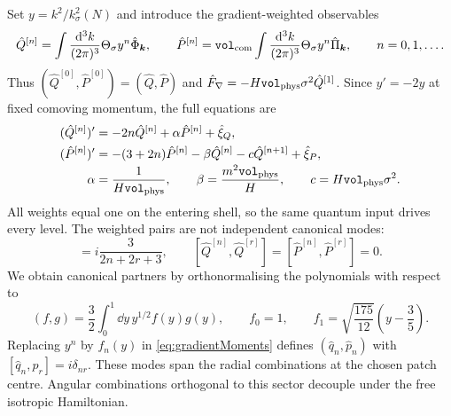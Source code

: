 \documentclass{article}
\newcommand{\VF}{\mathtt{vol}_{\rm com}}
\newcommand{\Vphys}{\mathtt{vol}_{\rm phys}}
\numberwithin{equation}{section}
\begin{document}
Set $y=k^2/k_\sigma^2(N)$ and introduce the gradient-weighted observables
\begin{equation}
 \hat Q^{[n]}=\int\frac{\dd^3k}{(2\pi)^3}\Theta_\sigma y^n\hat\Phi_{\bm k},
 \qquad
 \hat P^{[n]}=\VF\int\frac{\dd^3k}{(2\pi)^3}\Theta_\sigma y^n\hat\Pi_{\bm k},
 \qquad n=0,1,\ldots .
 \label{eq:gradientMoments}
\end{equation}
Thus $(\hat Q^{[0]},\hat P^{[0]})=(\hat Q,\hat P)$ and $\hat F_\nabla=-H\Vphys\sigma^2\hat Q^{[1]}$. Since $y'=-2y$ at fixed comoving momentum, the full equations are
\begin{subequations}\label{eq:gradientHierarchy}
\begin{align}
 (\hat Q^{[n]})'&=-2n\hat Q^{[n]}+\alpha\hat P^{[n]}+\hat\xi_Q,\\
 (\hat P^{[n]})'&=-(3+2n)\hat P^{[n]}-\beta\hat Q^{[n]}-c\hat Q^{[n+1]}+\hat\xi_P,\\[-2pt]
 \alpha&=\frac{1}{H\Vphys},\qquad \beta=\frac{m^2\Vphys}{H},\qquad c=H\Vphys\sigma^2.
\end{align}
\end{subequations}
All weights equal one on the entering shell, so the same quantum input drives every level. The weighted pairs are not independent canonical modes:
\begin{equation}
 [\hat Q^{[n]},\hat P^{[r]}]=i\frac{3}{2n+2r+3},\qquad
 [\hat Q^{[n]},\hat Q^{[r]}]=[\hat P^{[n]},\hat P^{[r]}]=0.
 \label{eq:gradientGram}
\end{equation}
We obtain canonical partners by orthonormalising the polynomials with respect to
\begin{equation}
 (f,g)=\frac32\int_0^1\dd y\,y^{1/2}f(y)g(y),\qquad
 f_0=1,\qquad f_1=\sqrt{\frac{175}{12}}\left(y-\frac35\right).
 \label{eq:gradientPolynomials}
\end{equation}
Replacing $y^n$ by $f_n(y)$ in \cref{eq:gradientMoments} defines $(\hat q_n,\hat p_n)$ with $[\hat q_n,\hat p_r]=i\delta_{nr}$. These modes span the radial combinations at the chosen patch centre. Angular combinations orthogonal to this sector decouple under the free isotropic Hamiltonian.
\end{document}
